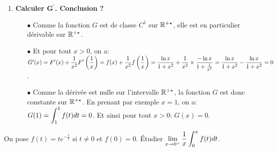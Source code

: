 \documentclass[a4paper, 11pt,reqno]{article}
\begin{document}
\begin{correction}
\begin{enumerate}
\begin{itemize}
		      \end{itemize}
		\item \textbf{Calculer $\mathbf{G^{\prime}}$. Conclusion ?}
		      \begin{itemize}
			      \item[$\bullet$] Comme la fonction $G$ est de classe $C^1$ sur $\mathbb{R}^{+\star}$, elle est en particulier d\'erivable sur $\mathbb{R}^{+\star}$.
			      \item[$\bullet$] Et pour tout $x>0$, on a: $G^{\prime}(x)=F^{\prime}(x)+\displaystyle\frac{1}{x^2}F^{\prime}\left( \displaystyle\frac{1}{x} \right)=f(x)+\displaystyle\frac{1}{x^2}f\left( \displaystyle\frac{1}{x} \right)=\displaystyle\frac{\ln{x}}{1+x^2}+\displaystyle\frac{1}{x^2}\times \displaystyle\frac{-\ln{x}}{1+\frac{1}{x^2}}=\displaystyle\frac{\ln{x}}{1+x^2}- \displaystyle\frac{\ln{x}}{1+x^2}=0$.
			      \item[$\bullet$] Comme la d\'eriv\'ee est nulle sur l'intervalle $\mathbb{R}^{+\star}$, la fonction $G$ est donc constante sur $\mathbb{R}^{+\star}$. En prenant par exemple $x=1$, on a: $G(1)= \displaystyle \int_1^1 f(t)dt=0$. Et ainsi pour tout $x>0$: $G(x)=0$.\\ \noindent {}
		      \end{itemize}
	\end{enumerate}
\end{correction}





\begin{exercice}  \;
	On pose $f(t)=te^{-\frac{1}{t}}$ si $t\not= 0$ et $f(0)=0$. \'Etudier $\lim\limits_{x\to 0^+} \displaystyle\frac{1}{x}\int_0^x f(t)dt$.
\end{exercice}
\end{document}
